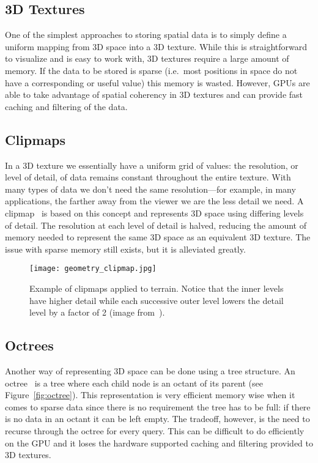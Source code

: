 \subsection{3D Textures}
One of the simplest approaches to storing spatial data is to simply define a uniform mapping from 3D space into a 3D texture. While this is straightforward to visualize and is easy to work with, 3D textures require a large amount of memory. If the data to be stored is sparse (i.e.\ most positions in space do not have a corresponding or useful value) this memory is wasted. However, GPUs are able to take advantage of spatial coherency in 3D textures and can provide fast caching and filtering of the data.

\subsection{Clipmaps}
In a 3D texture we essentially have a uniform grid of values: the resolution, or level of detail, of data remains constant throughout the entire texture. With many types of data we don't need the same resolution---for example, in many applications, the farther away from the viewer we are the less detail we need. A clipmap~\cite{Tanner:1998:CVM:280814.280855, Losasso:2004:GCT:1015706.1015799} is based on this concept and represents 3D space using differing levels of detail. The resolution at each level of detail is halved, reducing the amount of memory needed to represent the same 3D space as an equivalent 3D texture. The issue with sparse memory still exists, but it is alleviated greatly.


\begin{figure}[h]
\centering
\texttt{[image: geometry\_clipmap.jpg]}
\caption{Example of clipmaps applied to terrain. Notice that the inner levels have higher detail while each successive outer level lowers the detail level by a factor of 2 (image from~\cite{Losasso:2004:GCT:1015706.1015799}).}
\label{fig:geometryclipmaps}
\end{figure}

\subsection{Octrees}
Another way of representing 3D space can be done using a tree structure. An octree~\cite{MEAGHER1982129} is a tree where each child node is an octant of its parent (see Figure~\ref{fig:octree}). This representation is very efficient memory wise when it comes to sparse data since there is no requirement the tree has to be full: if there is no data in an octant it can be left empty. The tradeoff, however, is the need to recurse through the octree for every query. This can be difficult to do efficiently on the GPU and it loses the hardware supported caching and filtering provided to 3D textures.


